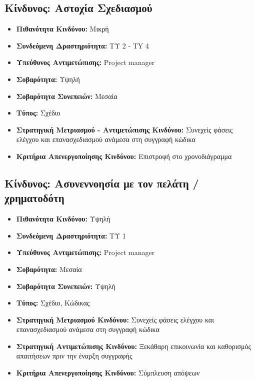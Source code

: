 \documentclass[12pt,a4paper]{article}
\begin{document}
\subsection{Κίνδυνος: Αστοχία Σχεδιασμού}
\begin{itemize}
	\item \textbf{Πιθανότητα Κινδύνου:} Μικρή
	\item \textbf{Συνδεόμενη Δραστηριότητα:} ΤΥ 2 - TY 4
	\item \textbf{Υπεύθυνος Αντιμετώπισης:} Project manager
	\item \textbf{Σοβαρότητα:} Υψηλή
	\item \textbf{Σοβαρότητα Συνεπειών:} Μεσαία
	\item \textbf{Τύπος:} Σχέδιο
	\item \textbf{Στρατηγική Μετριασμού - Αντιμετώπισης Κινδύνου:} Συνεχείς φάσεις ελέγχου και επανασχεδιασμού ανάμεσα στη συγγραφή κώδικα 
	\item \textbf{Κριτήρια Απενεργοποίησης Κινδύνου:} Επιστροφή στο χρονοδιάγραμμα
\end{itemize}

\subsection{Κίνδυνος: Ασυνεννοησία με τον πελάτη / χρηματοδότη}
\begin{itemize}
	\item \textbf{Πιθανότητα Κινδύνου:} Υψηλή
	\item \textbf{Συνδεόμενη Δραστηριότητα:} ΤΥ 1
	\item \textbf{Υπεύθυνος Αντιμετώπισης:} Project manager
	\item \textbf{Σοβαρότητα:} Μεσαία
	\item \textbf{Σοβαρότητα Συνεπειών:} Υψηλή
	\item \textbf{Τύπος:} Σχέδιο, Κώδικας
	\item \textbf{Στρατηγική Μετριασμού Κινδύνου:} Συνεχείς φάσεις ελέγχου και επανασχεδιασμού ανάμεσα στη συγγραφή κώδικα
	\item \textbf{Στρατηγική Αντιμετώπισης Κινδύνου:} Ξεκάθαρη επικοινωνία και καθορισμός απαιτήσεων πριν την έναρξη συγγραφής
	\item \textbf{Κριτήρια Απενεργοποίησης Κινδύνου:} Σύμπλευση απόψεων
\end{itemize}
\end{document}

